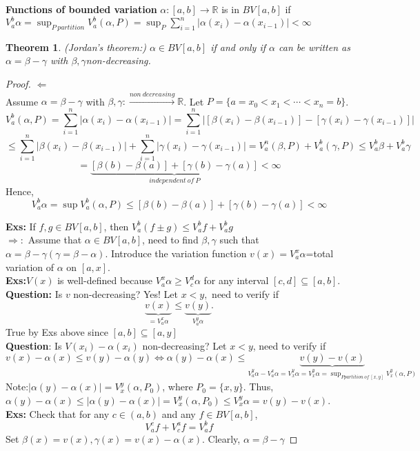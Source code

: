 \documentclass[12pt]{article}
\newtheorem{theorem}{Theorem}
\begin{document}
\textbf{Functions of bounded variation}
$\alpha: [a,b] \xrightarrow{}\mathbb{R}$ is in $BV[a,b]$ if $V_{a}^{b}\alpha=\sup_{P \ partition}V_{a}^{b}(\alpha,P)=\sup_{P}\sum_{i=1}^{n}|\alpha(x_i)-\alpha(x_{i-1})|<\infty$
\begin{theorem}
(Jordan's theorem:) $\alpha \in BV[a,b]$ if and only if $\alpha$ can be written as $\alpha=\beta-\gamma$ with $\beta, \gamma$non-decreasing.
\end{theorem}
\begin{proof}
$\Leftarrow$\\Assume $\alpha=\beta-\gamma$ with $\beta, \gamma: \xrightarrow{non\ decreasing}\mathbb{R}$. Let $P=\{a=x_0<x_1<\cdots<x_n=b\}$.$$V_{a}^{b}(\alpha,P)=\sum_{i=1}^{n}|\alpha(x_i)-\alpha(x_{i-1})|=\sum_{i=1}^{n}|[\beta(x_i)-\beta(x_{i-1})]-[\gamma(x_i)-\gamma(x_{i-1})]|$$$$\le\sum_{i=1}^{n}|\beta(x_i)-\beta(x_{i-1})|+\sum_{i=1}^{n}|\gamma(x_i)-\gamma(x_{i-1})|=V_{a}^{n}(\beta,P)+V_{a}^{b}(\gamma,P)\le V_{a}^{b}\beta+V_{a}^{b}\gamma$$$$=\underbrace{[\beta(b)-\beta(a)]+[\gamma(b)-\gamma(a)]}_{independent \ of \ P}<\infty$$Hence, $$V_{a}^{b}\alpha=\sup V_{a}^{b}(\alpha,P)\le [\beta(b)-\beta(a)]+[\gamma(b)-\gamma(a)] <\infty$$

\textbf{Exs:} If $f,g \in BV[a,b]$, then $V_{a}^{b}(f\pm g)\le V_{a}^{b}f+V_{a}^{b}g$ \\
$\Rightarrow:$ Assume that $\alpha \in BV[a,b]$, need to find $\beta,\gamma$ such that $\alpha=\beta-\gamma (\gamma=\beta-\alpha)$. Introduce the variation function $v(x)=V_{a}^{x}\alpha$=total variation of $\alpha$ on $[a,x]$.\\
\textbf{Exs:}$V(x)$ is well-defined because $V_{a}^{x}\alpha \ge V_{c}^{d}\alpha$ for any interval $[c,d]\subseteq [a,b]$.\\
\textbf{Question:} Is $v$ non-decreasing? Yes! Let $x<y,$ need to verify if $$\underbrace{v(x)}_{=V_{a}^{x}\alpha}\le \underbrace{v(y)}_{V_{a}^{y}\alpha}.$$ True by Exs above since $[a,b]\subseteq[a,y]$\\ \textbf{Question}: Is $V(x_i)-\alpha(x_i)$ non-decreasing? Let $x<y$, need to verify if $v(x)-\alpha(x)\le v(y)-\alpha(y)\Leftrightarrow \alpha(y)-\alpha(x)\le \underbrace{v(y)-v(x)}_{V_{a}^{y}\alpha-V_{a}^{x}\alpha=V_{x}^{y}\alpha=V_{x}^{y}\alpha=\sup_{P partition \ of\ [x,y] }V_{x}^{y}(\alpha,P)}$\\Note:$|\alpha(y)-\alpha(x)|=V_{x}^{y}(\alpha,P_0)$, where $P_0=\{x,y\}$. Thus, $\alpha(y)-\alpha(x)\le |\alpha(y)-\alpha(x)|=V_{x}^{y}(\alpha,P_0)\le V_{x}^{y}\alpha=v(y)-v(x)$.\\ \textbf{Exs:}
Check that for any $c \in (a,b)$ and any $f \in BV[a,b]$,$$V_{a}^{c}f+V_{c}^{a}f=V_{a}^{b}f$$
Set $\beta(x)=v(x), \gamma(x)=v(x)-\alpha(x)$. Clearly, $\alpha=\beta-\gamma$
\end{proof}
\end{document}
